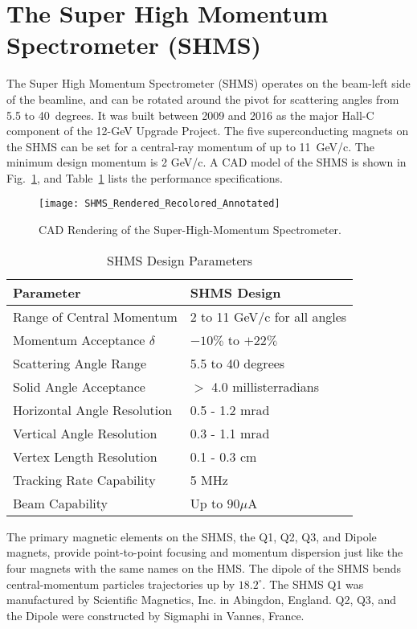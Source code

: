 \section{The Super High Momentum Spectrometer (SHMS)}

The Super High Momentum Spectrometer (SHMS) operates on the beam-left
side of the beamline, and can be rotated around the pivot for scattering angles from 5.5
to 40~degrees. It was built between 2009 and 2016 as the major
Hall-C component of the 12-GeV Upgrade Project.  The five superconducting
magnets on the SHMS can be set for a central-ray momentum of up to 11~GeV/c.
The minimum design momentum is 2 GeV/c. A CAD model of the SHMS is shown
in Fig.~\ref{fig:SHMS_CAD_Model}, and Table~\ref{tab:shms_specs} lists the performance specifications.

\begin{figure}
\texttt{[image: SHMS\_Rendered\_Recolored\_Annotated]}
\caption{CAD Rendering of the Super-High-Momentum Spectrometer. \label{fig:SHMS_CAD_Model}}
\end{figure}

\begin{table}
\begin{center}
\caption{SHMS Design Parameters\label{tab:shms_specs}}
\vspace{\baselineskip}
\begin{tabular}{|l|l|}
\hline
Parameter						& SHMS Design 			\\ \hline
Range of Central Momentum		& 2 to 11 GeV/c for all angles	\\
Momentum Acceptance $\delta$	& $-10\%$ to $+22\%$			\\
Scattering Angle Range			& 5.5 to 40 degrees			\\
Solid Angle Acceptance			& $>$ 4.0 millisterradians		\\
Horizontal Angle Resolution		& 0.5 - 1.2 mrad			\\
Vertical Angle Resolution			& 0.3 - 1.1 mrad			\\
Vertex Length Resolution			& 0.1 - 0.3 cm				\\
Tracking Rate Capability			& 5 MHz					\\
Beam Capability				& Up to $90 \mu$A			\\
\hline
\end{tabular}
\end{center}
\end{table}


The primary magnetic elements on the SHMS, the Q1, Q2, Q3, and Dipole magnets, provide
point-to-point focusing and momentum dispersion just like the four magnets with
the same names on the HMS. The dipole of the SHMS bends central-momentum particles
trajectories up by $18.2^{\circ}$. The SHMS Q1 was
manufactured by Scientific Magnetics, Inc. in Abingdon, England. Q2, Q3, and
the Dipole were constructed by Sigmaphi in Vannes, France.

